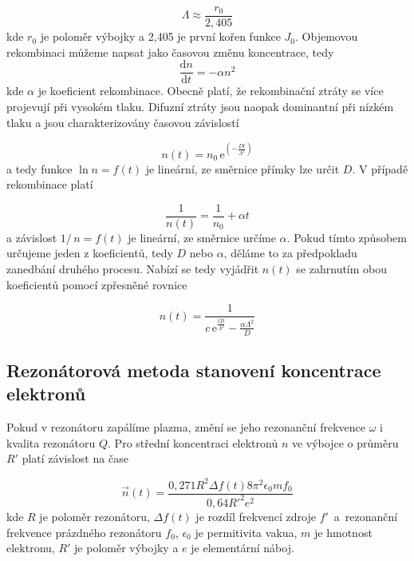 \documentclass[a4paper,12pt]{article}
\newcommand{\e}{\text{e}}
\begin{document}
\begin{equation}
	\Lambda \approx \frac{r_0}{2,405}
\end{equation}
kde $r_0$ je poloměr výbojky a 2,405 je první kořen funkce $J_0$.
Objemovou rekombinaci můžeme napsat jako časovou změnu koncentrace, tedy
\begin{equation}
	\frac{\text{d}n}{\text{d}t} = -\alpha n^2
\end{equation}
kde $\alpha$ je koeficient rekombinace. Obecně platí, že rekombinační ztráty se více projevují při vysokém tlaku. Difuzní ztráty jsou naopak dominantní při nízkém tlaku a jsou charakterizovány časovou závislostí 

\begin{equation}
	n(t) = n_0\,\e^{\left( -\frac{Dt}{\Lambda^2}\right)}
\end{equation}
a tedy funkce $\ln n = f(t)$ je lineární, ze směrnice přímky lze určit $D$. V 
případě rekombinace platí

\begin{equation}
	\frac{1}{n(t)} = \frac{1}{n_0} + \alpha t
\end{equation} 
a závislost $1/\,n = f(t)$ je lineární, ze směrnice určíme $\alpha$. Pokud tímto způsobem určujeme jeden z koeficientů, tedy $D$ nebo $\alpha$, děláme to za předpokladu zanedbání druhého procesu. Nabízí se tedy vyjádřit $n(t)$ se zahrnutím obou koeficientů pomocí zpřesněné rovnice

\begin{equation}
	n(t) = \frac{1}{c\,\e^{\frac{tD}{\Lambda^2}}-\frac{\alpha \Lambda^2}{D}}
	\label{zpresnena}
\end{equation}

\subsection{Rezonátorová metoda stanovení koncentrace elektronů}
Pokud v rezonátoru zapálíme plazma, změní se jeho rezonanční frekvence $\omega$ i kvalita rezonátoru $Q$. Pro střední koncentraci elektronů $n$ ve výbojce o průměru $R'$ platí závislost na čase

\begin{equation}
	\overrightarrow{n}(t) = \frac{0,271 R^2 \Delta f(t) 8 \pi^2 \epsilon_0 m f_0}{0,64 R'^2 e^2}
	\label{koncentrace}
\end{equation}
kde $R$ je poloměr rezonátoru, $\Delta f(t)$ je rozdíl frekvencí zdroje $f'$~a~rezonanční frekvence prázdného rezonátoru 
$f_0$, $\epsilon_0$ je permitivita vakua, $m$ je hmotnost elektronu, $R'$ je 
poloměr výbojky a $e$ je elementární náboj.
\end{document}
